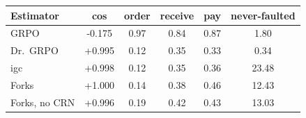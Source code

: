 \begin{tabular}{lccccc}
\toprule
Estimator & cos & order & receive & pay & never-faulted\\
\midrule
GRPO & -0.175 & 0.97 & 0.84 & 0.87 & 1.80 \\
Dr.~GRPO & +0.995 & 0.12 & 0.35 & 0.33 & 0.34 \\
igc & +0.998 & 0.12 & 0.35 & 0.36 & 23.48 \\
Forks & +1.000 & 0.14 & 0.38 & 0.46 & 12.43 \\
Forks, no CRN & +0.996 & 0.19 & 0.42 & 0.43 & 13.03 \\
\bottomrule
\end{tabular}
